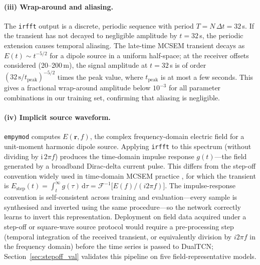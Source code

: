 \documentclass[journal]{IEEEtran}
\begin{document}
\paragraph{(iii) Wrap-around and aliasing.}
The \texttt{irfft} output is a discrete, periodic sequence with
period $T = N\,\Delta t = 32$\,s.  If the transient has not
decayed to negligible amplitude by $t = 32$\,s, the periodic
extension causes temporal aliasing.  The late-time MCSEM transient
decays as $E(t) \sim t^{-5/2}$ for a dipole source in a uniform
half-space; at the receiver offsets considered (20--200\,m), the
signal amplitude at $t = 32$\,s is of order
$(32\,\mathrm{s}/t_\mathrm{peak})^{-5/2}$ times the peak value,
where $t_\mathrm{peak}$ is at most a few seconds.  This gives a
fractional wrap-around amplitude below $10^{-3}$ for all parameter
combinations in our training set, confirming that aliasing is
negligible.

\paragraph{(iv) Implicit source waveform.}
\texttt{empymod} computes $E(\mathbf{r}, f)$, the complex
frequency-domain electric field for a unit-moment harmonic dipole
source.  Applying \texttt{irfft} to this spectrum (without
dividing by $\mathrm{i}\,2\pi f$) produces the time-domain
impulse response $g(t)$---the field generated by a broadband
Dirac-delta current pulse.  This differs from the step-off
convention widely used in time-domain MCSEM practice
\citep{constable2010ten}, for which the transient is
$E_\mathrm{step}(t) = \int_t^\infty g(\tau)\,\mathrm{d}\tau
= \mathcal{F}^{-1}\!\bigl[E(f)/(i2\pi f)\bigr]$.
The impulse-response convention is self-consistent across training
and evaluation---every sample is synthesised and inverted using
the same procedure---so the network correctly learns to invert
this representation.  Deployment on field data acquired under a
step-off or square-wave source protocol would require a
pre-processing step (temporal integration of the received
transient, or equivalently division by $i2\pi f$ in the frequency
domain) before the time series is passed to DualTCN;
Section~\ref{sec:stepoff_val} validates this pipeline on five
field-representative models.
\end{document}
